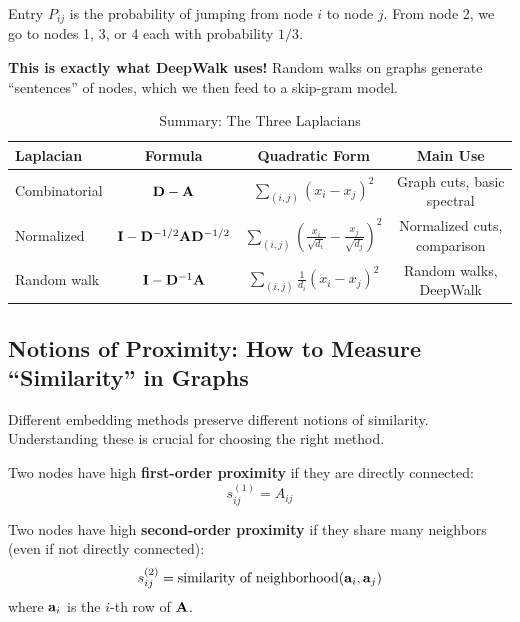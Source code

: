 \begin{notechapter}
\begin{example}
Entry $P_{ij}$ is the probability of jumping from node $i$ to node $j$. From node 2, we go to nodes 1, 3, or 4 each with probability $1/3$.

\textbf{This is exactly what DeepWalk uses!} Random walks on graphs generate ``sentences'' of nodes, which we then feed to a skip-gram model.
\end{example}

\begin{table}[htbp]
\centering
\caption{Summary: The Three Laplacians}
\begin{tabular}{@{}lccc@{}}
\toprule
\textbf{Laplacian} & \textbf{Formula} & \textbf{Quadratic Form} & \textbf{Main Use} \\
\midrule
Combinatorial & $\mathbf{D} - \mathbf{A}$ & $\sum_{(i,j)} (x_i - x_j)^2$ & Graph cuts, basic spectral \\
Normalized & $\mathbf{I} - \mathbf{D}^{-1/2}\mathbf{A}\mathbf{D}^{-1/2}$ & $\sum_{(i,j)} \left(\frac{x_i}{\sqrt{d_i}} - \frac{x_j}{\sqrt{d_j}}\right)^2$ & Normalized cuts, comparison \\
Random walk & $\mathbf{I} - \mathbf{D}^{-1}\mathbf{A}$ & $\sum_{(i,j)} \frac{1}{d_i}(x_i - x_j)^2$ & Random walks, DeepWalk \\
\bottomrule
\end{tabular}
\label{shallow-embeddings:tab:laplacians}
\end{table}

\subsection{Notions of Proximity: How to Measure ``Similarity'' in Graphs}

Different embedding methods preserve different notions of similarity. Understanding these is crucial for choosing the right method.

\begin{definition}
Two nodes have high \textbf{first-order proximity} if they are directly connected:
\[
s^{(1)}_{ij} = A_{ij}
\]
\end{definition}

\begin{definition}
Two nodes have high \textbf{second-order proximity} if they share many neighbors (even if not directly connected):
\[
s^{(2)}_{ij} = \text{similarity of neighborhood}(\mathbf{a}_i, \mathbf{a}_j)
\]
where $\mathbf{a}_i$ is the $i$-th row of $\mathbf{A}$.
\end{definition}


\end{notechapter}
